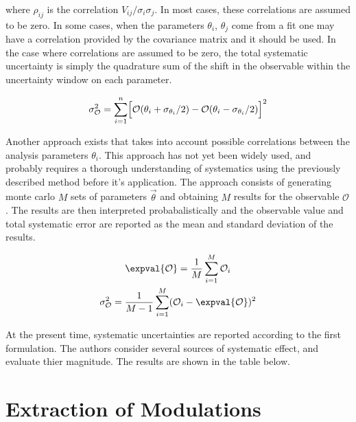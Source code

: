 where $\rho_{ij}$ is the correlation $V_{ij}/\sigma_i \sigma_j$.  In most cases, these correlations are assumed to be zero.  In some cases, when the parameters $\theta_i$, $\theta_j$ come from a fit one may have a correlation provided by the covariance matrix and it should be used.  In the case where correlations are assumed to be zero, the total systematic uncertainty is simply the quadrature sum of the shift in the observable within the uncertainty window on each parameter.

\begin{equation}
  \sigma_{\mathcal{O}}^{2} = \sum_{i=1}^{n} \Bigl[ \mathcal{O}(\theta_i + \sigma_{\theta_i}/2) - \mathcal{O}(\theta_i - \sigma_{\theta_i}/2) \Bigr]^2
\end{equation}

Another approach exists that takes into account possible correlations between the analysis parameters $\theta_i$.  This approach has not yet been widely used, and probably requires a thorough understanding of systematics using the previously described method before it's application.  The approach consists of generating monte carlo $M$ sets of parameters $\vec{\theta}$ and obtaining $M$ results for the observable $\mathcal{O}$.  The results are then interpreted probabalistically and the observable value and total systematic error are reported as the mean and standard deviation of the results.

\begin{gather}
  \expval{\mathcal{O}} = \frac{1}{M} \sum_{i=1}^{M} \mathcal{O}_i \\
  \sigma_{\mathcal{O}}^{2} = \frac{1}{M-1} \sum_{i=1}^{M} (\mathcal{O}_i - \expval{\mathcal{O}})^2
\end{gather}

At the present time, systematic uncertainties are reported according to the first formulation.  The authors consider several sources of systematic effect, and evaluate thier magnitude.  The results are shown in the table below.



\section{Extraction of Modulations}
